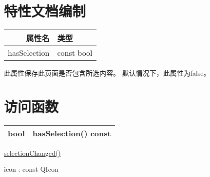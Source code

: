 \section{特性文档编制}

\begin{tabular}{|r|l|}
	\hline
	属性名&  类型\\
	\hline
	hasSelection&	const bool\\
	\hline
\end{tabular}

此属性保存此页面是否包含所选内容。 默认情况下，此属性为false。

\section{访问函数}

\begin{tabular}{|r|l|}
	\hline
	bool&  hasSelection() const\\
	\hline
\end{tabular}

\begin{seeAlso}
	\href{https://doc.qt.io/qt-5/qwebengineview.html#selectionChanged}{selectionChanged()}
\end{seeAlso}

icon : const QIcon









